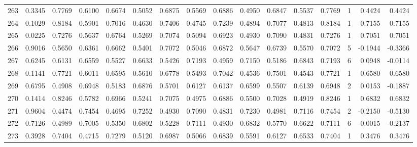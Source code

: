 \begin{tabular}{lrrrrrrrrrrrrrrr}
263 &      0.3345 &  0.7769 &  0.6100 &  0.6674 &  0.5052 &  0.6875 &  0.5569 &  0.6886 &  0.4950 &  0.6847 &   0.5537 &     0.7769 &      1 &                    0.4424 &                     0.4424 \\
264 &      0.1029 &  0.8184 &  0.5901 &  0.7016 &  0.4630 &  0.7406 &  0.4745 &  0.7239 &  0.4894 &  0.7077 &   0.4813 &     0.8184 &      1 &                    0.7155 &                     0.7155 \\
265 &      0.0225 &  0.7276 &  0.5637 &  0.6764 &  0.5269 &  0.7074 &  0.5094 &  0.6923 &  0.4930 &  0.7090 &   0.4831 &     0.7276 &      1 &                    0.7051 &                     0.7051 \\
266 &      0.9016 &  0.5650 &  0.6361 &  0.6662 &  0.5401 &  0.7072 &  0.5046 &  0.6872 &  0.5647 &  0.6739 &   0.5570 &     0.7072 &      5 &                   -0.1944 &                    -0.3366 \\
267 &      0.6245 &  0.6131 &  0.6559 &  0.5527 &  0.6633 &  0.5426 &  0.7193 &  0.4959 &  0.7150 &  0.5186 &   0.6843 &     0.7193 &      6 &                    0.0948 &                    -0.0114 \\
268 &      0.1141 &  0.7721 &  0.6011 &  0.6595 &  0.5610 &  0.6778 &  0.5493 &  0.7042 &  0.4536 &  0.7501 &   0.4543 &     0.7721 &      1 &                    0.6580 &                     0.6580 \\
269 &      0.6795 &  0.4908 &  0.6948 &  0.5183 &  0.6876 &  0.5701 &  0.6127 &  0.6137 &  0.6599 &  0.5507 &   0.6139 &     0.6948 &      2 &                    0.0153 &                    -0.1887 \\
270 &      0.1414 &  0.8246 &  0.5782 &  0.6966 &  0.5241 &  0.7075 &  0.4975 &  0.6886 &  0.5500 &  0.7028 &   0.4919 &     0.8246 &      1 &                    0.6832 &                     0.6832 \\
271 &      0.9604 &  0.4474 &  0.7454 &  0.4695 &  0.7252 &  0.4930 &  0.7090 &  0.4831 &  0.7230 &  0.4981 &   0.7116 &     0.7454 &      2 &                   -0.2150 &                    -0.5130 \\
272 &      0.7126 &  0.4989 &  0.7005 &  0.5350 &  0.6802 &  0.5228 &  0.7111 &  0.4930 &  0.6832 &  0.5770 &   0.6622 &     0.7111 &      6 &                   -0.0015 &                    -0.2137 \\
273 &      0.3928 &  0.7404 &  0.4715 &  0.7279 &  0.5120 &  0.6987 &  0.5066 &  0.6839 &  0.5591 &  0.6127 &   0.6533 &     0.7404 &      1 &                    0.3476 &                     0.3476 \\

\end{tabular}

